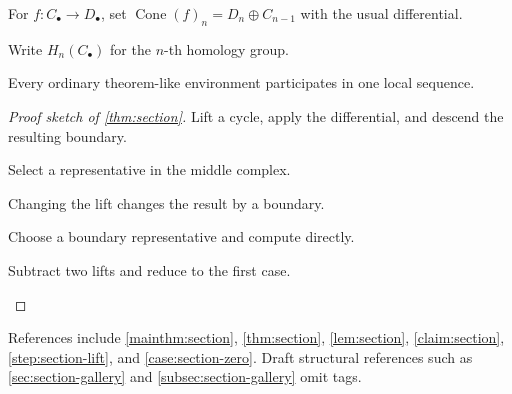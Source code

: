 \documentclass[sectionlevel=section,status=draft]{noteformyself}
\begin{document}
\begin{construction}[
  title={Mapping cone},
  label=\labelNFM{constr:section}
]
  For \(f\colon C_\bullet\to D_\bullet\), set
  \(\operatorname{Cone}(f)_n=D_n\oplus C_{n-1}\) with the usual differential.
\end{construction}

\begin{notation}[label=\labelNFM{not:section}]
  Write \(H_n(C_\bullet)\) for the \(n\)-th homology group.
\end{notation}

\begin{remark}[
  title={Shared numbering},
  label=\labelNFM{rmk:section}
]
  Every ordinary theorem-like environment participates in one local sequence.
\end{remark}

\begin{proof}[Proof sketch of \cref{thm:section}]
  Lift a cycle, apply the differential, and descend the resulting boundary.

  \begin{step}\label{step:section-lift}
    Select a representative in the middle complex.
  \end{step}

  \begin{claim}[label=\labelNFM{claim:section}]
    Changing the lift changes the result by a boundary.
  \end{claim}

  \begin{case}\label{case:section-zero}
    Choose a boundary representative and compute directly.
  \end{case}

  \begin{case}\label{case:section-general}
    Subtract two lifts and reduce to the first case.
  \end{case}
\end{proof}

References include \cref{mainthm:section}, \cref{thm:section},
\cref{lem:section}, \cref{claim:section}, \cref{step:section-lift}, and
\cref{case:section-zero}. Draft structural references such as
\cref{sec:section-gallery} and \cref{subsec:section-gallery} omit tags.

\end{document}
